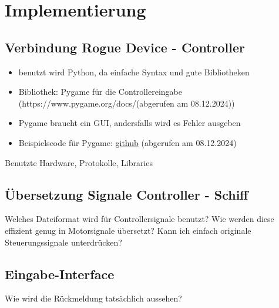 \chapter{Implementierung}

\section{Verbindung Rogue Device - Controller}
\begin{itemize}
    \item benutzt wird Python, da einfache Syntax und gute Bibliotheken
    \item Bibliothek: Pygame für die Controllereingabe (https://www.pygame.org/docs/(abgerufen am 08.12.2024))
    \item Pygame braucht ein GUI, andersfalls wird es Fehler ausgeben
    \item Beispielscode für Pygame: \href{https://github.com/kevinmcaleer/xbox_controller}{github} (abgerufen am 08.12.2024)
\end{itemize}


Benutzte Hardware, Protokolle, Libraries

\section{Übersetzung Signale Controller - Schiff}
Welches Dateiformat wird für Controllersignale benutzt?
Wie werden diese effizient genug in Motorsignale übersetzt?
Kann ich einfach originale Steuerungssignale unterdrücken?

\section{Eingabe-Interface}
Wie wird die Rückmeldung tatsächlich aussehen?